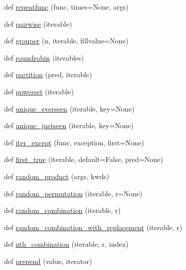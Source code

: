 \begin{DoxyCompactItemize}
def \hyperlink{namespacemore__itertools_1_1recipes_a18056a0b9753f79901a3c7fd04ac880f}{repeatfunc} (func, times=None, args)
\item 
def \hyperlink{namespacemore__itertools_1_1recipes_a477d223bd446f8adb19e3e3c01cccb6f}{pairwise} (iterable)
\item 
def \hyperlink{namespacemore__itertools_1_1recipes_a654f713d06d41d740a2b2ac4c3a52fbd}{grouper} (n, iterable, fillvalue=None)
\item 
def \hyperlink{namespacemore__itertools_1_1recipes_ae11f688fd6dc665c014e396ff41b03cf}{roundrobin} (iterables)
\item 
def \hyperlink{namespacemore__itertools_1_1recipes_a260ce2b6a650dd423b430a7038d79159}{partition} (pred, iterable)
\item 
def \hyperlink{namespacemore__itertools_1_1recipes_a12a76688001a6778691bb8174aea0bcf}{powerset} (iterable)
\item 
def \hyperlink{namespacemore__itertools_1_1recipes_ae04c0e99048d06439e3225bf9e931c94}{unique\+\_\+everseen} (iterable, key=None)
\item 
def \hyperlink{namespacemore__itertools_1_1recipes_adfffd7653dc27192b5f9d5cf69531514}{unique\+\_\+justseen} (iterable, key=None)
\item 
def \hyperlink{namespacemore__itertools_1_1recipes_a42d0a60e7c9143fbc96a4033462ad7d0}{iter\+\_\+except} (func, exception, first=None)
\item 
def \hyperlink{namespacemore__itertools_1_1recipes_aa803f5a62b2be71f11d9ebf71d1f0de2}{first\+\_\+true} (iterable, default=False, pred=None)
\item 
def \hyperlink{namespacemore__itertools_1_1recipes_a648d1e66c985c58f3e359f53b475e8eb}{random\+\_\+product} (args, kwds)
\item 
def \hyperlink{namespacemore__itertools_1_1recipes_a2a5a87c0a50c30bb8da6d078d5bbdec1}{random\+\_\+permutation} (iterable, r=None)
\item 
def \hyperlink{namespacemore__itertools_1_1recipes_a024a1437cf49722d56bdfda6a965574e}{random\+\_\+combination} (iterable, r)
\item 
def \hyperlink{namespacemore__itertools_1_1recipes_a872452acad1fd3105000cb6d30b33bc0}{random\+\_\+combination\+\_\+with\+\_\+replacement} (iterable, r)
\item 
def \hyperlink{namespacemore__itertools_1_1recipes_a876c7c479546a7c16bfd39dde32ff354}{nth\+\_\+combination} (iterable, r, index)
\item 
def \hyperlink{namespacemore__itertools_1_1recipes_a41254019483516268635407b58e620c5}{prepend} (value, iterator)
\end{DoxyCompactItemize}


